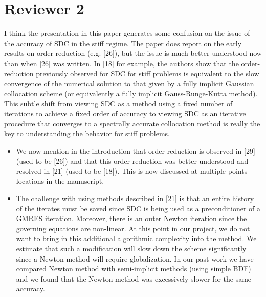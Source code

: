 \documentclass[12pt]{article}
\newcommand{\comment}[1]{{\color{blue} #1}}
\begin{document}
\section*{Reviewer 2}
\comment{I think the presentation in this paper generates some
confusion on the issue of the accuracy of SDC in the stiff regime. The
paper does report on the early results on order reduction (e.g. [26]),
but the issue is much better understood now than when [26] was written.
In [18] for example, the authors show that the order-reduction
previously observed for SDC for stiff problems is equivalent to the slow
convergence of the numerical solution to that given by a fully implicit
Gaussian collocation scheme (or equivalently a fully implicit
Gauss-Runge-Kutta method). This subtle shift from viewing SDC as a
method using a fixed number of iterations to achieve a fixed order of
accuracy to viewing SDC as an iterative procedure that converges to a
spectrally accurate collocation method is really the key to
understanding the behavior for stiff problems.}
\begin{itemize}
  \item We now mention in the introduction that order reduction is
  observed in [29] (used to be [26]) and that this order reduction was
  better understood and resolved in [21] (used to be [18]).  This is
  now discussed at multiple points locations in the manuscript.

  \item The challenge with using methods described in [21] is that an
  entire history of the iterates must be saved since SDC is being used
  as a preconditioner of a GMRES iteration.  Moreover, there is an outer
  Newton iteration since the governing equations are non-linear.  At
  this point in our project, we do not want to bring in this additional
  algorithmic complexity into the method.  We estimate that such a
  modification will slow down the scheme significantly since a Newton
  method will require globalization.  In our past work we have compared
  Newton method with semi-implicit methods (using simple BDF) and we
  found that the Newton method was excessively slower for the same
  accuracy.
\end{itemize}
\end{document}
